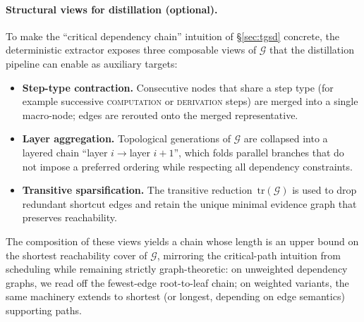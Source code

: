    \paragraph{Structural views for distillation (optional).}
    To make the ``critical dependency chain'' intuition of \S\ref{sec:tgsd} concrete, the deterministic extractor exposes three composable views of $\mathcal{G}$ that the distillation pipeline can enable as auxiliary targets:
    \begin{itemize}[leftmargin=*,itemsep=1pt]
        \item \textbf{Step-type contraction.} Consecutive nodes that share a step type (for example successive \textsc{computation} or \textsc{derivation} steps) are merged into a single macro-node; edges are rerouted onto the merged representative.
        \item \textbf{Layer aggregation.} Topological generations of $\mathcal{G}$ are collapsed into a layered chain ``layer $i\!\to\!$layer $i+1$'', which folds parallel branches that do not impose a preferred ordering while respecting all dependency constraints.
        \item \textbf{Transitive sparsification.} The transitive reduction~$\mathrm{tr}(\mathcal{G})$ is used to drop redundant shortcut edges and retain the unique minimal evidence graph that preserves reachability.
    \end{itemize}
    The composition of these views yields a chain whose length is an upper bound on the shortest reachability cover of $\mathcal{G}$, mirroring the critical-path intuition from scheduling while remaining strictly graph-theoretic: on unweighted dependency graphs, we read off the fewest-edge root-to-leaf chain; on weighted variants, the same machinery extends to shortest (or longest, depending on edge semantics) supporting paths.
    
    
    
    
